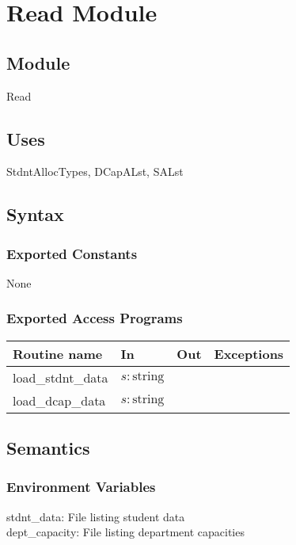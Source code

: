 \documentclass[12pt]{article}
\begin{document}
\newpage

\section* {Read Module}

\subsection* {Module}

Read

\subsection* {Uses}

StdntAllocTypes, DCapALst, SALst

\subsection* {Syntax}

\subsubsection* {Exported Constants}

None

\subsubsection* {Exported Access Programs}

\begin{tabular}{| l | l | l | l |}
\hline
\textbf{Routine name} & \textbf{In} & \textbf{Out} & \textbf{Exceptions}\\
\hline
load\_stdnt\_data & $s: \mbox{string}$ & ~ & ~\\
\hline
load\_dcap\_data & $s: \mbox{string}$ & ~ & ~\\
\hline
\end{tabular}

\subsection* {Semantics}

\subsubsection* {Environment Variables}

stdnt\_data: File listing student data\\
dept\_capacity: File listing department capacities
\end{document}
